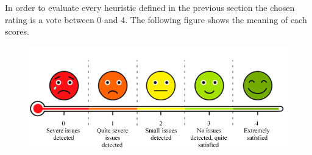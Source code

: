 In order to evaluate every heuristic defined in the previous section the chosen rating is a vote between 0 and 4. The following figure shows the meaning of each scores. 
\begin{figure}[h!]
	\centering
 	\begin{minipage}[b]{1\textwidth}
    		\includegraphics[width=\textwidth]{./assets/scoring.png}
	\end{minipage}
\end{figure}
\FloatBarrier